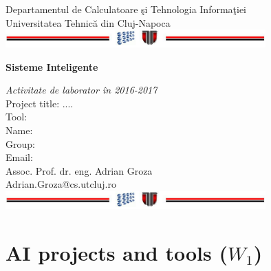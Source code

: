 \documentclass[a4paper,12pt]{report}
\begin{document}
\vspace{-5cm}
\begin{center}
Departamentul de Calculatoare \c si Tehnologia Informa\c tiei\\
Universitatea Tehnic\u a din Cluj-Napoca\\
\includegraphics[width=10cm]{fig/footer}
\end{center}
\vspace{1cm}
\begin{center}
  \begin{Large}
    \textbf{Sisteme Inteligente}\\
  \end{Large}
  \textit{Activitate de laborator \^in 2016-2017}\\
\vspace{3cm}
Project title: ....\\
Tool: \\
\vspace{1.5cm}
Name:\\
Group:\\
Email:\\
\vspace{6cm}
Assoc. Prof. dr. eng. Adrian Groza\\
Adrian.Groza@cs.utcluj.ro\\
\vspace{1cm}
\includegraphics[width=10cm]{fig/footer}
\end{center}

\tableofcontents

\chapter{AI projects and tools ($W_1$)}


\colorbox{blue!20}{}
\vspace{0.2cm}
\end{document}
